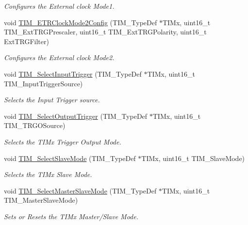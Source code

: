 \begin{DoxyCompactItemize}
\begin{DoxyCompactList}\small\item\em Configures the External clock Mode1. \end{DoxyCompactList}\item 
void \hyperlink{group___t_i_m_ga0a9cbcbab32326cbbdaf4c111f59ec20}{T\-I\-M\-\_\-\-E\-T\-R\-Clock\-Mode2\-Config} (T\-I\-M\-\_\-\-Type\-Def $\ast$T\-I\-Mx, uint16\-\_\-t T\-I\-M\-\_\-\-Ext\-T\-R\-G\-Prescaler, uint16\-\_\-t T\-I\-M\-\_\-\-Ext\-T\-R\-G\-Polarity, uint16\-\_\-t Ext\-T\-R\-G\-Filter)
\begin{DoxyCompactList}\small\item\em Configures the External clock Mode2. \end{DoxyCompactList}\item 
void \hyperlink{group___t_i_m_ga4252583c6ae8a73d6fc66f7e951dbc35}{T\-I\-M\-\_\-\-Select\-Input\-Trigger} (T\-I\-M\-\_\-\-Type\-Def $\ast$T\-I\-Mx, uint16\-\_\-t T\-I\-M\-\_\-\-Input\-Trigger\-Source)
\begin{DoxyCompactList}\small\item\em Selects the Input Trigger source. \end{DoxyCompactList}\item 
void \hyperlink{group___t_i_m_ga28745aaa549e2067e42c19569209e6c6}{T\-I\-M\-\_\-\-Select\-Output\-Trigger} (T\-I\-M\-\_\-\-Type\-Def $\ast$T\-I\-Mx, uint16\-\_\-t T\-I\-M\-\_\-\-T\-R\-G\-O\-Source)
\begin{DoxyCompactList}\small\item\em Selects the T\-I\-Mx Trigger Output Mode. \end{DoxyCompactList}\item 
void \hyperlink{group___t_i_m_ga2f19ce1d90990691cf037e419ba08003}{T\-I\-M\-\_\-\-Select\-Slave\-Mode} (T\-I\-M\-\_\-\-Type\-Def $\ast$T\-I\-Mx, uint16\-\_\-t T\-I\-M\-\_\-\-Slave\-Mode)
\begin{DoxyCompactList}\small\item\em Selects the T\-I\-Mx Slave Mode. \end{DoxyCompactList}\item 
void \hyperlink{group___t_i_m_ga4dcc3d11b670c381d0ff9cb7e9fd01e2}{T\-I\-M\-\_\-\-Select\-Master\-Slave\-Mode} (T\-I\-M\-\_\-\-Type\-Def $\ast$T\-I\-Mx, uint16\-\_\-t T\-I\-M\-\_\-\-Master\-Slave\-Mode)
\begin{DoxyCompactList}\small\item\em Sets or Resets the T\-I\-Mx Master/\-Slave Mode. \end{DoxyCompactList}\item 

\end{DoxyCompactItemize}
